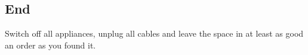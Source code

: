 \documentclass[../Elmag-labhefte-2020.tex]{subfiles}
\begin{document}
\subsection{End}

Switch off all appliances, unplug all cables and leave the space in at least as good an order as you found it.
\end{document}
